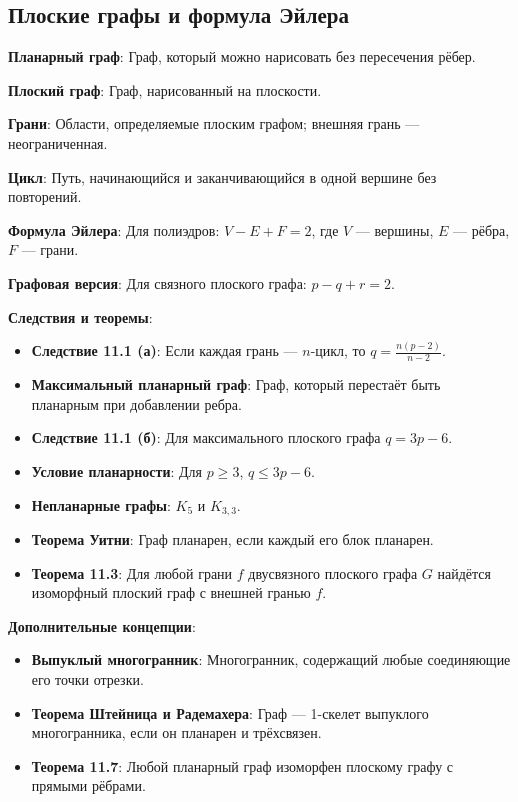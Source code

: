 \subsection{Плоские графы и формула Эйлера}

\noindent\textbf{Планарный граф}: Граф, который можно нарисовать без пересечения рёбер.

\noindent\textbf{Плоский граф}: Граф, нарисованный на плоскости.

\noindent\textbf{Грани}: Области, определяемые плоским графом; внешняя грань — неограниченная.

\noindent\textbf{Цикл}: Путь, начинающийся и заканчивающийся в одной вершине без повторений.

\noindent\textbf{Формула Эйлера}:
Для полиэдров: \( V - E + F = 2 \), где \( V \) — вершины, \( E \) — рёбра, \( F \) — грани.

\noindent\textbf{Графовая версия}:
Для связного плоского графа: \( p - q + r = 2 \).

\noindent\textbf{Следствия и теоремы}:
\begin{itemize}
    \item \textbf{Следствие 11.1 (а)}: Если каждая грань — \( n \)-цикл, то \( q = \frac{n(p-2)}{n-2} \).
    \item \textbf{Максимальный планарный граф}: Граф, который перестаёт быть планарным при добавлении ребра.
    \item \textbf{Следствие 11.1 (б)}: Для максимального плоского графа \( q = 3p - 6 \).
    \item \textbf{Условие планарности}: Для \( p \geq 3 \), \( q \leq 3p - 6 \).
    \item \textbf{Непланарные графы}: \( K_5 \) и \( K_{3,3} \).
    \item \textbf{Теорема Уитни}: Граф планарен, если каждый его блок планарен.
    \item \textbf{Теорема 11.3}: Для любой грани \( f \) двусвязного плоского графа \( G \) найдётся изоморфный плоский граф с внешней гранью \( f \).
\end{itemize}

\noindent\textbf{Дополнительные концепции}:
\begin{itemize}
    \item \textbf{Выпуклый многогранник}: Многогранник, содержащий любые соединяющие его точки отрезки.
    \item \textbf{Теорема Штейница и Радемахера}: Граф — 1-скелет выпуклого многогранника, если он планарен и трёхсвязен.
    \item \textbf{Теорема 11.7}: Любой планарный граф изоморфен плоскому графу с прямыми рёбрами.
\end{itemize}